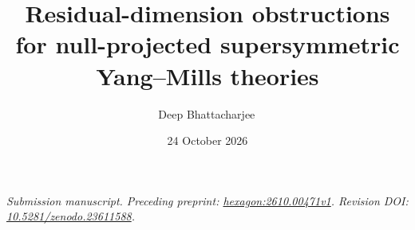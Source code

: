 \documentclass[aps,prd,reprint,onecolumn,10pt,superscriptaddress,nofootinbib,notitlepage]{revtex4-2}
\numberwithin{equation}{section}
\begin{document}
\title{Residual-dimension obstructions for null-projected supersymmetric Yang--Mills theories}
\author{Deep Bhattacharjee\,}
\date{24 October 2026}
\begin{abstract}

\end{abstract}
\maketitle
\noindent\textit{Submission manuscript. Preceding preprint: \href{https://hexagonmath.org/2610.00471v1}{hexagon:2610.00471v1}. Revision DOI: \href{https://doi.org/10.5281/zenodo.23611588}{10.5281/zenodo.23611588}.}\par\medskip



\end{document}
